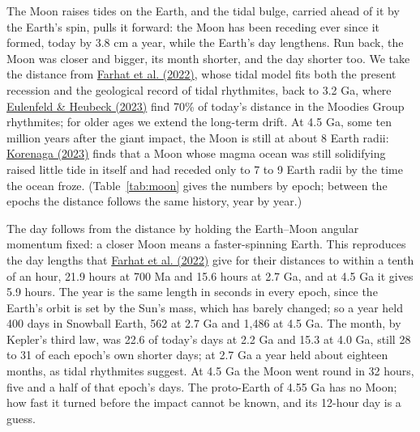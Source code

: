 \documentclass[9pt,twocolumn]{extarticle}
\begin{document}
The Moon raises tides on the Earth, and the tidal bulge, carried ahead of it by the Earth's spin, pulls it forward: the Moon has been receding ever since it formed, today by 3.8 cm a year, while the Earth's day lengthens. Run back, the Moon was closer and bigger, its month shorter, and the day shorter too. We take the distance from \protect\hyperlink{cite.farhat2022}{Farhat et al. (2022)}, whose tidal model fits both the present recession and the geological record of tidal rhythmites, back to 3.2 Ga, where \protect\hyperlink{cite.eulenfeld2023}{Eulenfeld \& Heubeck (2023)} find 70\% of today's distance in the Moodies Group rhythmites; for older ages we extend the long-term drift. At 4.5 Ga, some ten million years after the giant impact, the Moon is still at about 8 Earth radii: \protect\hyperlink{cite.korenaga2023}{Korenaga (2023)} finds that a Moon whose magma ocean was still solidifying raised little tide in itself and had receded only to 7 to 9 Earth radii by the time the ocean froze. (Table~\ref{tab:moon} gives the numbers by epoch; between the epochs the distance follows the same history, year by year.)

The day follows from the distance by holding the Earth--Moon angular momentum fixed: a closer Moon means a faster-spinning Earth. This reproduces the day lengths that \protect\hyperlink{cite.farhat2022}{Farhat et al. (2022)} give for their distances to within a tenth of an hour, 21.9 hours at 700 Ma and 15.6 hours at 2.7 Ga, and at 4.5 Ga it gives 5.9 hours. The year is the same length in seconds in every epoch, since the Earth's orbit is set by the Sun's mass, which has barely changed; so a year held 400 days in Snowball Earth, 562 at 2.7 Ga and 1,486 at 4.5 Ga. The month, by Kepler's third law, was 22.6 of today's days at 2.2 Ga and 15.3 at 4.0 Ga, still 28 to 31 of each epoch's own shorter days; at 2.7 Ga a year held about eighteen months, as tidal rhythmites suggest. At 4.5 Ga the Moon went round in 32 hours, five and a half of that epoch's days. The proto-Earth of 4.55 Ga has no Moon; how fast it turned before the impact cannot be known, and its 12-hour day is a guess.
\end{document}
